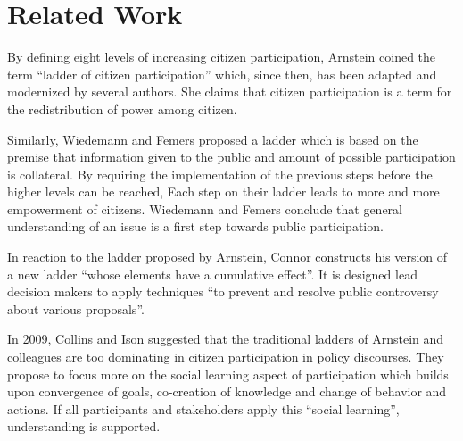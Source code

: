 \section{Related Work}
\label{chap:related_work}
By defining eight levels of increasing citizen participation, Arnstein \cite{Arnstein1969_citizen_participation} coined the term ``ladder of citizen participation'' which, since then, has been adapted and modernized \cite{Connor1988_new_ladder,carver2003future,Collins2009_social_learning,you2009_participatory_map_based,Cai2009_spatial_annotation_deliberation} by several authors. She claims that citizen participation is a term for the redistribution of power among citizen.

Similarly, Wiedemann and Femers \cite{Wiedemann1993355} proposed a ladder which is based on the premise that information given to the public and amount of possible participation is collateral. By requiring the implementation of the previous steps before the higher levels can be reached, Each step on their ladder leads to more and more empowerment of citizens. Wiedemann and Femers conclude that general understanding of an issue is a first step towards public participation.

In reaction to the ladder proposed by Arnstein, Connor \cite{Connor1988_new_ladder} constructs his version of a new ladder ``whose elements have a cumulative effect''. It is designed lead decision makers to apply techniques ``to prevent and resolve public controversy about various proposals''.

In 2009, Collins and Ison \cite{Collins2009_social_learning} suggested that the traditional ladders of Arnstein and colleagues are too dominating in citizen participation in policy discourses. They propose to focus more on the social learning aspect of participation which builds upon convergence of goals, co-creation of knowledge and change of behavior and actions. If all participants and stakeholders apply this ``social learning'', understanding is supported.


